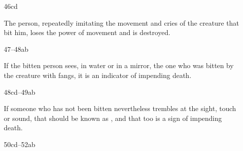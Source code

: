 \begin{translation}
\begin{itemize}
{The main interpreters state that it is the limb or the location of
the bite that becomes numb, not that the person loses consciousness.
It is tempting to think that a more original text might have been
referring to the victim losing consciousness.
[375]{srik-1991} took this view (against the commentator
Aruṇadatta): “\ldots\ the person gets into stupor \ldots ."}

And it is in the main marked by the signs of someone who has been
pierced by a poisoned arrow.\footnote{ “marked by”
    is not a common word and is perhaps a hapax legomenon.  The vulgate
    has the simpler expression .}

\item[46cd]

The person, repeatedly imitating the movement and cries of the creature that 
bit him, loses the power of movement and is destroyed. 

\item [47--48ab]

If the bitten person sees, in water or in a mirror, the one who was bitten by 
the creature with fangs, it is an indicator of impending death.

\item [48cd--49ab]

If someone who has not been bitten nevertheless trembles at the sight, touch 
or sound, that should be known as , and that too 
is a sign of impending death.

\item[50cd--52ab]
        



\end{itemize}

    \end{translation}
\endinput




%

